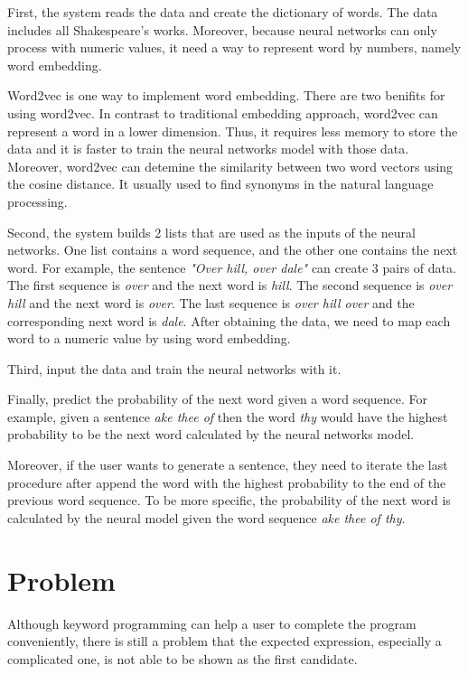 \documentclass[PRO,english]{ipsj}
\begin{document}
First, the system reads the data and create the dictionary of words. The data includes all Shakespeare's works. Moreover, because neural networks can only process with numeric values, it need a way to represent word by numbers, namely word embedding. 

Word2vec is one way to implement word embedding. There are two benifits for using word2vec. In contrast to traditional embedding approach, word2vec can represent a word in a lower dimension. Thus, it requires less memory to store the data and it is faster to train the neural networks model with those data. Moreover, word2vec can detemine the similarity between two word vectors using the cosine distance. It usually used to find synonyms in the natural language processing.  


Second, the system builds 2 lists that are used as the inputs of the neural networks. One list contains a word sequence, and the other one contains the next word. For example, the sentence \textit{"Over hill, over dale"} can create 3 pairs of data. The first sequence is \textit{over} and the next word is \textit{hill}. The second sequence is \textit{over hill} and the next word is \textit{over}. The last sequence is \textit{over hill over} and the corresponding next word is \textit{dale}. After obtaining the data, we need to map each word to a numeric value by using word embedding.

Third, input the data and train the neural networks with it. 

Finally, predict the probability of the next word given a word sequence. For example, given a sentence \textit{ake thee of} then the word \textit{thy} would have the highest probability to be the next word calculated by the neural networks model.

Moreover, if the user wants to generate a sentence, they need to iterate the last procedure after append the word with the highest probability to the end of the previous word sequence. To be more specific, the probability of the next word is calculated by the neural model given the word sequence \textit{ake thee of thy}.


\section{Problem}\label{sec:problem}
Although keyword programming can help a user to complete the program conveniently, there is still a problem that the expected expression, especially a complicated one, is not able to be shown as the first candidate.
\end{document}
